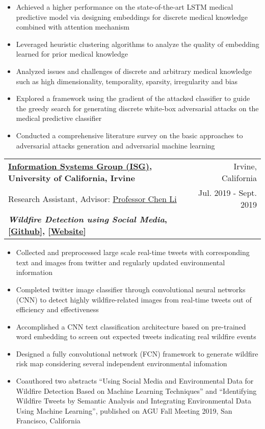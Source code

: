 \documentclass[letterpaper,11pt]{article}
\makeatletter
\newcommand{\resumeSubheading}[6]{
  \vspace{-1pt}\item
    \begin{tabular*}{0.97\textwidth}[t]{l@{\extracolsep{\fill}}r}
      \textbf{#1} & #2 \\
      #3 & #4 \\
      \textbf{#5} & \textbf{#6} \\
    \end{tabular*}\vspace{-5pt}
}
\makeatother
\begin{document}
        \begin{itemize}
          \item Achieved a higher performance on the state-of-the-art LSTM medical predictive model via designing embeddings for discrete medical knowledge combined with attention mechanism
          
          \item Leveraged heuristic clustering algorithms to analyze the quality of embedding learned for prior medical knowledge
       
          \item Analyzed issues and challenges of discrete and arbitrary medical knowledge such as high dimensionality, temporality, sparsity, irregularity and bias
          
          \item Explored a framework using the gradient of the attacked classifier to guide the greedy search for generating discrete white-box adversarial attacks on the medical predictive classifier 
          
          \item Conducted a comprehensive literature survey on the basic approaches to adversarial attacks generation and adversarial machine learning
          
        \end{itemize}
        
    \resumeSubheading
      {\href{https://isg.ics.uci.edu/}{Information Systems Group (ISG)}, University of California, Irvine}{Irvine, California}
      {Research Assistant, Advisor: \href{https://chenli.ics.uci.edu/}{Professor Chen Li}}{Jul. 2019 - Sept. 2019}
      {\textit{Wildfire Detection using Social Media}, [\href{https://github.com/Yicong-Huang/Wildfires}{Github}], [\href{http://wildfires.ics.uci.edu:2333/}{Website}]}{}
      
        \begin{itemize}
          \item Collected and preprocessed large scale real-time tweets with corresponding text and images from twitter and regularly updated environmental information
          \item Completed twitter image classifier through convolutional neural networks (CNN) to detect highly wildfire-related images from real-time tweets out of efficiency and effectiveness
          \item Accomplished a CNN text classification architecture based on pre-trained word embedding to screen out expected tweets indicating real wildfire events
          \item Designed a fully convolutional network (FCN) framework to generate wildfire risk map considering several independent environmental infomation
          \item Coauthored two abstracts ``Using Social Media and Environmental Data for Wildfire Detection Based on Machine Learning Techniques'' and ``Identifying Wildfire Tweets by Semantic Analysis and Integrating Environmental Data Using Machine Learning'', published on AGU Fall Meeting 2019, San Francisco, California
        \end{itemize}
        
\end{document}
